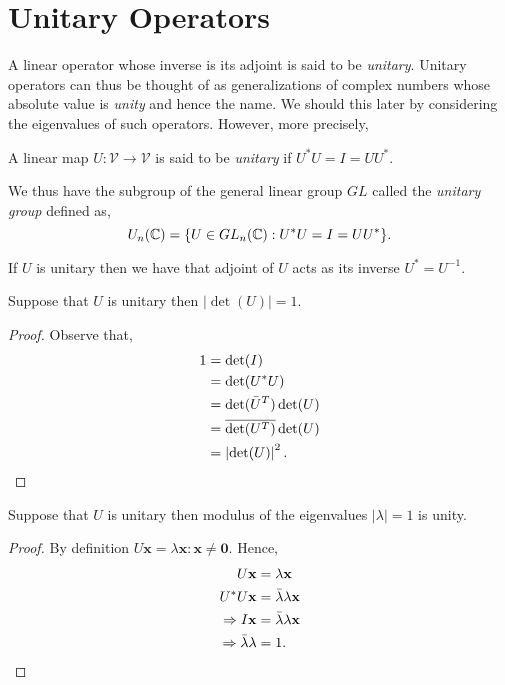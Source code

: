 
\section{Unitary Operators} %
\label{sec:unitary}

A linear operator whose inverse is its adjoint is said to be
\emph{unitary}. Unitary operators can thus be thought of as
generalizations of complex numbers whose absolute value is
\emph{unity} and hence the name. We should this later by
considering the eigenvalues of such operators. However,
more precisely,

\begin{defn}[Unitary]
 A linear map $U : \mathcal{V} \to \mathcal{V}$ is said to be
 \emph{unitary} if $U^{*} U = I = U U^{*}$.
\end{defn}

We thus have the subgroup of the general linear group $GL$
called the \emph{unitary group} defined as,
\[
 U_n(\mathbb{C}) = \{ U \in GL_n(\mathbb{C}) : U^{*}U = I = UU^{*} \}.
\]

\begin{cor}
 If $U$ is unitary then we have that adjoint of $U$
 acts as its inverse $U^{*}=U^{-1}$.
\end{cor}

\begin{lem}
 Suppose that $U$ is unitary then $| \det(U) | = 1$.
\end{lem}

\begin{proof}
 Observe that,
 \begin{align*}
  1 &= \det(I)
  \\
  &= \det(U^{*} U)
  \\
  &= \det(\bar{U}^{T}) \det(U)
  \\
  &= \overline{\det(U^{T})} \det(U)
  \\
  &= \left| \det(U) \right|^{2}. \qedhere
 \end{align*}
\end{proof}

\begin{lem}
 Suppose that $U$ is unitary then modulus of the eigenvalues
 $| \lambda | = 1$ is unity.
\end{lem}

\begin{proof}
 By definition $U \mathbf{x} = \lambda \mathbf{x} : \mathbf{x} \neq \mathbf{0}$.
 Hence,
 \begin{align*}
  U \mathbf{x} &= \lambda \mathbf{x}
  \\
  U^{*} U \mathbf{x} &= \bar{\lambda} \lambda \mathbf{x}
  \\
  \Rightarrow I \mathbf{x} &= \bar{\lambda} \lambda \mathbf{x}
  \\
  \Rightarrow \bar{\lambda} \lambda &= 1. \qedhere
 \end{align*}
\end{proof}

